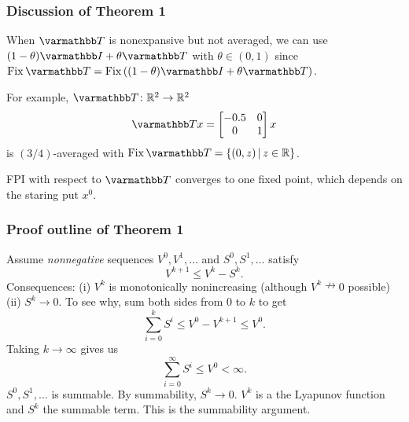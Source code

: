 \documentclass[10pt,mathserif]{beamer}
\begin{document}
\begin{frame}[plain]
\frametitle{Discussion of Theorem 1}
When $\opT $ is nonexpansive but not averaged, we can use $(1-\theta)\opI+\theta \opT $ with $\theta\in (0,1)$ since $\fix \opT  = \fix ((1-\theta)\opI+\theta \opT) $.

\vspace{0.2in}
For example, $\opT \colon\reals^2\rightarrow\reals^2$
\[
\opT x=\begin{bmatrix}
-0.5&0\\
0&1
\end{bmatrix}x
\]
is $(3/4)$-averaged with $\fix \opT  = \{(0,z)\,|\,z\in \reals\}$.
\begin{center}
\end{center}
FPI with respect to $\opT $ converges to one fixed point, which depends on the staring put $x^0$.
\end{frame}


\begin{frame}
\frametitle{Proof outline of Theorem 1}
Assume \emph{nonnegative} sequences
$V^0,V^1,\dots$
and
$S^0,S^1,\dots$ satisfy
\[
V^{k+1}\le V^k-S^k.
\]
Consequences: (i) $V^k$ is monotonically nonincreasing (although $V^k\nrightarrow 0$ possible)
(ii) $S^k\rightarrow 0$.
To see why, sum both sides from $0$ to $k$ to get
\[
\sum^k_{i=0}S^i \le V^0-V^{k+1}\le V^0.
\]
Taking $k\rightarrow\infty$ gives us
\[
\sum^\infty_{i=0}S^i \le V^0<\infty.
\]
$S^0,S^1,\dots$ is summable. By summability, $S^k\rightarrow 0$.
$V^k$ is a the Lyapunov function and $S^k$ the summable term. This is the summability argument.
\end{frame}
\end{document}
